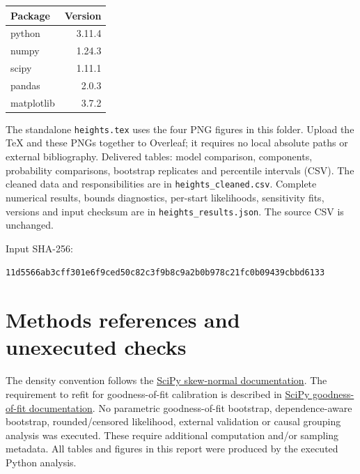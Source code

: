 \documentclass[11pt,a4paper]{article}
\begin{document}
\begin{center}
\small
\begin{tabular}{lr}
\toprule
Package & Version\\
\midrule
python & 3.11.4\\
numpy & 1.24.3\\
scipy & 1.11.1\\
pandas & 2.0.3\\
matplotlib & 3.7.2\\
\bottomrule
\end{tabular}
\end{center}
The standalone \texttt{heights.tex} uses the four PNG figures in this folder.
Upload the TeX and these PNGs together to Overleaf; it requires no local
absolute paths or external bibliography. Delivered tables: model comparison,
components, probability comparisons, bootstrap replicates and percentile
intervals (CSV). The cleaned data and responsibilities are in
\texttt{heights\_cleaned.csv}. Complete numerical results, bounds diagnostics,
per-start likelihoods, sensitivity fits, versions and input checksum are in
\texttt{heights\_results.json}. The source CSV is unchanged.

Input SHA-256:\par{\scriptsize\texttt{11d5566ab3cff301e6f9ced50c82c3f9\allowbreak b8c9a2b0b978c21fc0b09439cbbd6133}}

\section*{Methods references and unexecuted checks}
The density convention follows the
\href{https://docs.scipy.org/doc/scipy/reference/generated/scipy.stats.skewnorm.html}{SciPy skew-normal documentation}.
The requirement to refit for goodness-of-fit calibration is described in
\href{https://docs.scipy.org/doc/scipy/reference/generated/scipy.stats.goodness_of_fit.html}{SciPy goodness-of-fit documentation}.
No parametric goodness-of-fit bootstrap, dependence-aware bootstrap,
rounded/censored likelihood, external validation or causal grouping analysis
was executed. These require additional computation and/or sampling metadata.
All tables and figures in this report were produced by the executed Python analysis.
\end{document}
